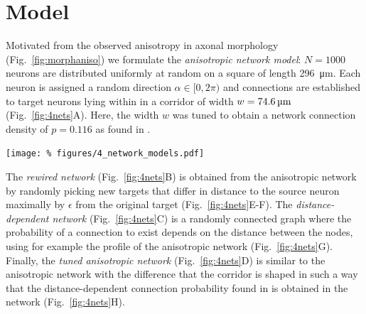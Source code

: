 
\vspace{-1.5cm}
\section*{Model}
\vspace{-0.2cm}

Motivated from the observed anisotropy in axonal morphology
(Fig.~\ref{fig:morphaniso}) we formulate the \textit{anisotropic
  network model}: $N=1000$ neurons are distributed uniformly at random
on a square of length \SI{296}{\micro\meter}. Each neuron is assigned
a random direction $\alpha \in [0,2\pi)$ and connections are
established to target neurons lying within in a corridor of width
$w=\text{\SI{74.6}{\micro\meter}}$ (Fig.~\ref{fig:4nets}A). Here, the
width $w$ was tuned to obtain a network connection density of
$p=0.116$ as found in \cite{Song2005}.

\begin{center}\vspace{0.3cm}
  \texttt{[image: \%
    figures/4\_network\_models.pdf]}
  \label{fig:4nets}
\end{center}\vspace{2cm}

The \textit{rewired network} (Fig.~\ref{fig:4nets}B) is obtained from
the anisotropic network by randomly picking new targets that differ in
distance to the source neuron maximally by $\epsilon$ from the
original target (Fig.~\ref{fig:4nets}E-F). The
\textit{distance-dependent network} (Fig.~\ref{fig:4nets}C) is a
randomly connected graph where the probability of a connection to
exist depends on the distance between the nodes, using for example the
profile of the anisotropic network (Fig.~\ref{fig:4nets}G). Finally,
the \textit{tuned anisotropic network} (Fig.~\ref{fig:4nets}D) is
similar to the anisotropic network with the difference that the
corridor is shaped in such a way that the distance-dependent
connection probability found in \cite{Perin2011} is obtained in the
network (Fig.~\ref{fig:4nets}H).



